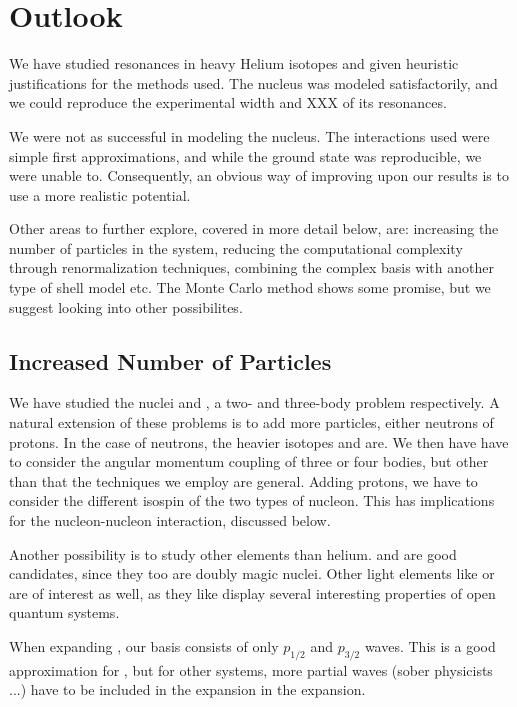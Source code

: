 \documentclass[../main/report.tex]{subfiles}
\begin{document}
\chapter{Outlook}
\label{cha:outlook}

We have studied resonances in heavy Helium isotopes and given heuristic justifications for the methods used. The  nucleus was modeled satisfactorily, and we could reproduce the experimental width and XXX of its resonances. 

We were not as successful in modeling the  nucleus. The interactions used were simple first approximations, and while the ground state was reproducible, we were unable to. Consequently, an obvious way of improving upon our results is to use a more realistic potential. 

Other areas to further explore, covered in more detail below, are: increasing the number of particles in the system, reducing the computational complexity through renormalization techniques, combining the complex basis with another type of shell model etc.
The Monte Carlo method shows some promise, but we suggest looking into other possibilites.

\section{Increased Number of Particles}

We have studied the nuclei  and , a two- and three-body problem respectively. 
A natural extension of these problems is to add more particles, either neutrons of protons.
In the case of neutrons, the heavier \He{} isotopes  and  are.
We then have have to consider the angular momentum coupling of three or four bodies, but other than that the techniques we employ are general.
Adding protons, we have to consider the different isospin of the two types of nucleon.
This has implications for the nucleon-nucleon interaction, discussed below.

Another possibility is to study other elements than helium.  and  are good candidates, since they too are doubly magic nuclei.
Other light elements like  or  are of interest as well, as they like \He{} display several interesting properties of open quantum systems.

When expanding , our basis consists of only $p_{1/2}$ and $p_{3/2}$ waves. 
This is a good approximation for  \cite{gamow_shell_model_2008},  but for other systems, more partial waves (sober physicists ...) have to be included in the expansion in the expansion.
\end{document}

